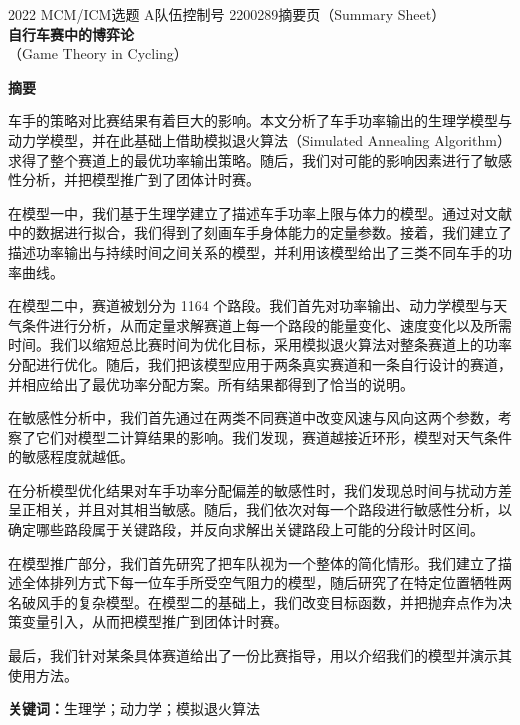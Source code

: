 \documentclass[11pt,a4paper]{ctexart}
\begin{document}
\thispagestyle{empty}
\begin{center}
{\small 2022 MCM/ICM\quad 选题 A\quad 队伍控制号 2200289\quad 摘要页（Summary Sheet）}\\[18pt]
{\LARGE\bfseries 自行车赛中的博弈论}\\[8pt]
{\large （Game Theory in Cycling）}\\[10pt]
\end{center}

\begin{center}
{\large\bfseries 摘\quad 要}
\end{center}

\vspace{6pt}
车手的策略对比赛结果有着巨大的影响。本文分析了车手功率输出的生理学模型与动力学模型，并在此基础上借助模拟退火算法（Simulated Annealing Algorithm）求得了整个赛道上的最优功率输出策略。随后，我们对可能的影响因素进行了敏感性分析，并把模型推广到了团体计时赛。

在模型一中，我们基于生理学建立了描述车手功率上限与体力的模型。通过对文献中的数据进行拟合，我们得到了刻画车手身体能力的定量参数。接着，我们建立了描述功率输出与持续时间之间关系的模型，并利用该模型给出了三类不同车手的功率曲线。

在模型二中，赛道被划分为 1164 个路段。我们首先对功率输出、动力学模型与天气条件进行分析，从而定量求解赛道上每一个路段的能量变化、速度变化以及所需时间。我们以缩短总比赛时间为优化目标，采用模拟退火算法对整条赛道上的功率分配进行优化。随后，我们把该模型应用于两条真实赛道和一条自行设计的赛道，并相应给出了最优功率分配方案。所有结果都得到了恰当的说明。

在敏感性分析中，我们首先通过在两类不同赛道中改变风速与风向这两个参数，考察了它们对模型二计算结果的影响。我们发现，赛道越接近环形，模型对天气条件的敏感程度就越低。

在分析模型优化结果对车手功率分配偏差的敏感性时，我们发现总时间与扰动方差呈正相关，并且对其相当敏感。随后，我们依次对每一个路段进行敏感性分析，以确定哪些路段属于关键路段，并反向求解出关键路段上可能的分段计时区间。

在模型推广部分，我们首先研究了把车队视为一个整体的简化情形。我们建立了描述全体排列方式下每一位车手所受空气阻力的模型，随后研究了在特定位置牺牲两名破风手的复杂模型。在模型二的基础上，我们改变目标函数，并把抛弃点作为决策变量引入，从而把模型推广到团体计时赛。

最后，我们针对某条具体赛道给出了一份比赛指导，用以介绍我们的模型并演示其使用方法。

\vspace{6pt}
\noindent\textbf{关键词：}生理学；动力学；模拟退火算法
\end{document}
